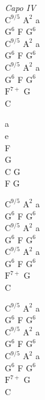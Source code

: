 \begin{chordw}
    \textit{Capo IV}\\
    $\mathrm{C^{9/5}}$ $\mathrm{A^2}$ a\\
    $\mathrm{G^6}$ F $\mathrm{G^6}$\\
    $\mathrm{C^{9/5}}$ $\mathrm{A^2}$ a\\
    $\mathrm{G^6}$ F $\mathrm{G^6}$\\
    $\mathrm{C^{9/5}}$ $\mathrm{A^2}$ a\\
    $\mathrm{G^6}$ F $\mathrm{G^6}$\\
    $\mathrm{F^{7+}}$ G\\
    C

    a\\
    e\\
    F\\
    G\\
    C G\\
    F G

    $\mathrm{C^{9/5}}$ $\mathrm{A^2}$ a\\
    $\mathrm{G^6}$ F $\mathrm{G^6}$\\
    $\mathrm{C^{9/5}}$ $\mathrm{A^2}$ a\\
    $\mathrm{G^6}$ F $\mathrm{G^6}$\\
    $\mathrm{C^{9/5}}$ $\mathrm{A^2}$ a\\
    $\mathrm{G^6}$ F $\mathrm{G^6}$\\
    $\mathrm{F^{7+}}$ G\\
    C

    $\mathrm{C^{9/5}}$ $\mathrm{A^2}$ a\\
    $\mathrm{G^6}$ F $\mathrm{G^6}$\\
    $\mathrm{C^{9/5}}$ $\mathrm{A^2}$ a\\
    $\mathrm{G^6}$ F $\mathrm{G^6}$\\
    $\mathrm{C^{9/5}}$ $\mathrm{A^2}$ a\\
    $\mathrm{G^6}$ F $\mathrm{G^6}$\\
    $\mathrm{F^{7+}}$ G\\
    C
\end{chordw}

